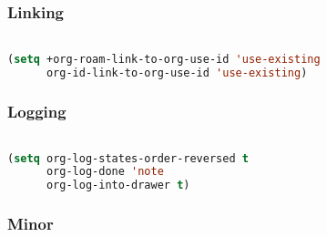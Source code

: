\documentclass[11pt]{article}
\begin{document}
\subsubsection{Linking}
\label{sec:linking}
\begin{lstlisting}[language=Lisp]%! Someone please complete this list for me

(setq +org-roam-link-to-org-use-id 'use-existing
      org-id-link-to-org-use-id 'use-existing)
\end{lstlisting}

\subsubsection{Logging}
\label{sec:logging}
\begin{lstlisting}[language=Lisp]%! Someone please complete this list for me

(setq org-log-states-order-reversed t
      org-log-done 'note
      org-log-into-drawer t)
\end{lstlisting}

\subsubsection{Minor}
\label{sec:minor}
\end{document}
